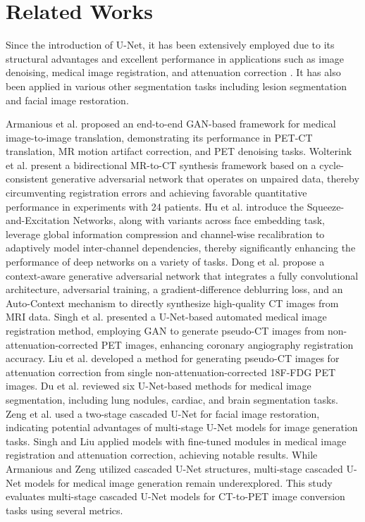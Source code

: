 \documentclass[a4paper, times, 10pt,twocolumn]{article}
\begin{document}
\section{Related Works}
Since the introduction of U-Net, it has been extensively employed due to its structural advantages and excellent performance in applications such as image denoising\cite{lehtinen_noise2noise_2018}, medical image registration, and attenuation correction \cite{balakrishnan_voxelmorph_2019}. It has also been applied in various other segmentation tasks including lesion segmentation and facial image restoration.

Armanious et al. \cite{armanious_medgan_2020} proposed an end-to-end GAN-based framework for medical image-to-image translation, demonstrating its performance in PET-CT translation, MR motion artifact correction, and PET denoising tasks. Wolterink et al. \cite{tsaftaris_deep_2017} present a bidirectional MR-to-CT synthesis framework based on a cycle-consistent generative adversarial network that operates on unpaired data, thereby circumventing registration errors and achieving favorable quantitative performance in experiments with 24 patients. Hu et al.\cite{hu_squeeze-and-excitation_2018} introduce the Squeeze-and-Excitation Networks, along with variants across face embedding task\cite{deng_wfacenets_2020}, leverage global information compression and channel-wise recalibration to adaptively model inter-channel dependencies, thereby significantly enhancing the performance of deep networks on a variety of tasks. Dong et al. \cite{descoteaux_medical_2017} propose a context-aware generative adversarial network that integrates a fully convolutional architecture, adversarial training, a gradient-difference deblurring loss, and an Auto-Context mechanism to directly synthesize high-quality CT images from MRI data.
Singh et al. \cite{singh_automated_2023} presented a U-Net-based automated medical image registration method, employing GAN to generate pseudo-CT images from non-attenuation-corrected PET images, enhancing coronary angiography registration accuracy. Liu et al. \cite{liu_deep_2018} developed a method for generating pseudo-CT images for attenuation correction from single non-attenuation-corrected 18F-FDG PET images. Du et al. \cite{du_medical_2020} reviewed six U-Net-based methods for medical image segmentation, including lung nodules, cardiac, and brain segmentation tasks. Zeng et al. \cite{zeng_swin-casunet_2022} used a two-stage cascaded U-Net for facial image restoration, indicating potential advantages of multi-stage U-Net models for image generation tasks. Singh and Liu applied models with fine-tuned modules in medical image registration and attenuation correction, achieving notable results. While Armanious and Zeng utilized cascaded U-Net structures, multi-stage cascaded U-Net models for medical image generation remain underexplored. This study evaluates multi-stage cascaded U-Net models for CT-to-PET image conversion tasks using several metrics.
\end{document}
